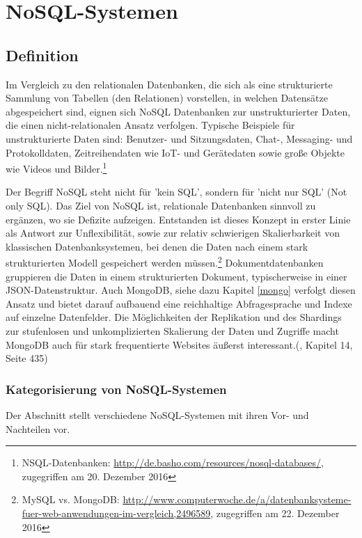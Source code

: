 \chapter{NoSQL-Systemen}
\section{Definition}
Im Vergleich zu den relationalen Datenbanken, die sich als eine strukturierte Sammlung von Tabellen (den Relationen) vorstellen, in welchen Datensätze abgespeichert sind, eignen sich NoSQL Datenbanken zur unstrukturierter Daten, die einen nicht-relationalen Ansatz verfolgen. Typische Beispiele für unstrukturierte Daten sind: Benutzer- und Sitzungsdaten, Chat-, Messaging- und Protokolldaten, Zeitreihendaten wie IoT- und Gerätedaten sowie große Objekte wie Videos und Bilder.\footnote{NSQL-Datenbanken: \url{http://de.basho.com/resources/nosql-databases/}, zugegriffen am 20. Dezember 2016}

Der Begriff NoSQL steht nicht für 'kein SQL', sondern für 'nicht nur SQL' (Not only SQL). Das Ziel von NoSQL ist, relationale Datenbanken sinnvoll zu ergänzen, wo sie Defizite aufzeigen. Entstanden ist dieses Konzept in erster Linie als Antwort zur Unflexibilität, sowie zur relativ schwierigen Skalierbarkeit von klassischen Datenbanksystemen, bei denen die Daten nach einem stark strukturierten Modell gespeichert werden müssen.\footnote{MySQL vs. MongoDB: \url{http://www.computerwoche.de/a/datenbanksysteme-fuer-web-anwendungen-im-vergleich,2496589}, zugegriffen am 22. Dezember 2016} Dokumentdatenbanken gruppieren die Daten in einem strukturierten Dokument, typischerweise in einer JSON-Datenstruktur. Auch MongoDB, siehe dazu Kapitel \ref{mongo} verfolgt diesen Ansatz und bietet darauf aufbauend eine reichhaltige Abfragesprache und Indexe auf einzelne Datenfelder. Die Möglichkeiten der Replikation und des Shardings zur stufenlosen und unkomplizierten Skalierung der Daten und Zugriffe macht MongoDB auch für stark frequentierte Websites äußerst interessant.(\cite{Hollosi.2012}, Kapitel 14, Seite 435)
\subsection{Kategorisierung von NoSQL-Systemen}
Der Abschnitt stellt verschiedene NoSQL-Systemen mit ihren Vor- und Nachteilen vor.
